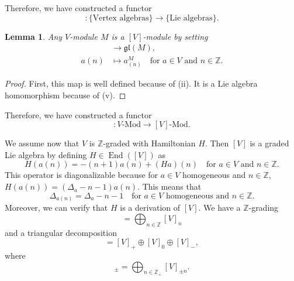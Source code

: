 \documentclass[a4paper, 12pt, reqno]{amsart}
\newtheorem{lemma}[theorem]{Lemma}
\theoremstyle{remark}
\numberwithin{equation}{subsection}
\DeclareMathOperator{\End}{End}
\begin{document}
Therefore, we have constructed a functor
\begin{equation*}
  [\bullet]: \{\text{Vertex algebras}\} \to \{\text{Lie algebras}\}.
\end{equation*}

\begin{lemma}
  \label{lmm:14}
  Any $V$-module $M$ is a $[V]$-module by setting
  \begin{align*}
    [V] &\to \mathfrak{gl}(M), \\
    a(n) &\mapsto a^M_{(n)} \quad \text{for }a \in V\text{ and }n \in \mathbb{Z}.
  \end{align*}
\end{lemma}

\begin{proof}
  First, this map is well defined because of (ii).
  It is a Lie algebra homomorphism because of (v).
\end{proof}

Therefore, we have constructed a functor
\begin{equation*}
  [\bullet]: V\text{-Mod} \to [V]\text{-Mod}.
\end{equation*}

We assume now that $V$ is $\mathbb{Z}$-graded with Hamiltonian $H$.
Then $[V]$ is a graded Lie algebra by defining $H \in \End([V])$ as
\begin{equation*}
  H(a(n)) = -(n + 1)a(n) + (Ha)(n) \quad \text{for }a \in V\text{ and }n \in \mathbb{Z}.
\end{equation*}
This operator is diagonalizable because for $a \in V$ homogeneous and $n \in \mathbb{Z}$, $H(a(n)) = (\Delta_a - n - 1)a(n)$.
This means that
\begin{equation*}
  \Delta_{a(n)} = \Delta_a - n - 1 \quad \text{for }a \in V\text{ homogeneous and }n \in \mathbb{Z}.
\end{equation*}
Moreover, we can verify that $H$ is a derivation of $[V]$.
We have a $\mathbb{Z}$-grading
\begin{equation*}
  [V] = \bigoplus_{n \in \mathbb{Z}}[V]_n
\end{equation*}
and a triangular decomposition
\begin{equation*}
  [V] = [V]_+ \oplus [V]_0 \oplus [V]_-,
\end{equation*}
where
\begin{equation*}
  [V]_{\pm} = \bigoplus_{n \in \mathbb{Z}_+}[V]_{\pm n}.
\end{equation*}
\end{document}
